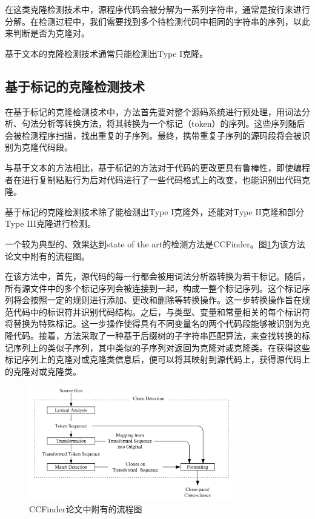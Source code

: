\documentclass[UTF8]{ctexart}
\begin{document}
在这类克隆检测技术中，源程序代码会被分解为一系列字符串，通常是按行来进行分解。在检测过程中，我们需要找到多个待检测代码中相同的字符串的序列，以此来判断是否为克隆对。

基于文本的克隆检测技术通常只能检测出Type I克隆。

\subsection{基于标记的克隆检测技术}

在基于标记的克隆检测技术中，方法首先要对整个源码系统进行预处理，用词法分析、句法分析等转换方法，将其转换为一个标记（token）的序列。这些序列随后会被检测程序扫描，找出重复的子序列。最终，携带重复子序列的源码段将会被识别为克隆代码段。

与基于文本的方法相比，基于标记的方法对于代码的更改更具有鲁棒性，即使编程者在进行复制粘贴行为后对代码进行了一些代码格式上的改变，也能识别出代码克隆。

基于标记的克隆检测技术除了能检测出Type I克隆外，还能对Type II克隆和部分Type III克隆进行检测。

一个较为典型的、效果达到state of the art的检测方法是CCFinder\cite{Kamiya2002}。图\ref{CCFinder}为该方法论文中附有的流程图。

在该方法中，首先，源代码的每一行都会被用词法分析器转换为若干标记。随后，所有源文件中的多个标记序列会被连接到一起，构成一整个标记序列。这个标记序列将会按照一定的规则进行添加、更改和删除等转换操作。这一步转换操作旨在规范代码中的标识符并识别代码结构。之后，与类型、变量和常量相关的每个标识符将替换为特殊标记。这一步操作使得具有不同变量名的两个代码段能够被识别为克隆代码。接着，方法采取了一种基于后缀树的子字符串匹配算法，来查找转换的标记序列上的类似子序列，其中类似的子序列对返回为克隆对或克隆类。在获得这些标记序列上的克隆对或克隆类信息后，便可以将其映射到源代码上，获得源代码上的克隆对或克隆类。

\begin{figure}[h]
	\centering
	\includegraphics[height=5cm]{Figures/CCFinder}
	\caption{CCFinder论文中附有的流程图}
	\label{CCFinder}
\end{figure}
\end{document}

